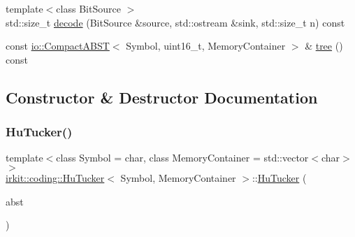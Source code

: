 \begin{DoxyCompactItemize}
\item 
{\footnotesize template$<$class Bit\+Source $>$ }\\std\+::size\+\_\+t \mbox{\hyperlink{classirkit_1_1coding_1_1HuTucker_a2c4e9a57c3eec1627d95e776330f67f7}{decode}} (Bit\+Source \&source, std\+::ostream \&sink, std\+::size\+\_\+t n) const
\item 
const \mbox{\hyperlink{classirkit_1_1io_1_1CompactABST}{io\+::\+Compact\+A\+B\+ST}}$<$ Symbol, uint16\+\_\+t, Memory\+Container $>$ \& \mbox{\hyperlink{classirkit_1_1coding_1_1HuTucker_a36caf73ad9a33cfe361ae8920c08a751}{tree}} () const
\end{DoxyCompactItemize}


\subsection{Constructor \& Destructor Documentation}
\mbox{\label{classirkit_1_1coding_1_1HuTucker_aa491f386d09d0e9c56f3f3558f2774a3}} 
\subsubsection{\texorpdfstring{Hu\+Tucker()}{HuTucker()}\hspace{0.1cm}{\footnotesize\ttfamily [1/2]}}
{\footnotesize\ttfamily template$<$class Symbol  = char, class Memory\+Container  = std\+::vector$<$char$>$$>$ \\
\mbox{\hyperlink{classirkit_1_1coding_1_1HuTucker}{irkit\+::coding\+::\+Hu\+Tucker}}$<$ Symbol, Memory\+Container $>$\+::\mbox{\hyperlink{classirkit_1_1coding_1_1HuTucker}{Hu\+Tucker}} (\begin{DoxyParamCaption}\item[{\mbox{\hyperlink{classirkit_1_1io_1_1CompactABST}{io\+::\+Compact\+A\+B\+ST}}$<$ Symbol, uint16\+\_\+t, Memory\+Container $>$}]{abst }\end{DoxyParamCaption})\hspace{0.3cm}{\ttfamily [inline]}}

\mbox{\label{classirkit_1_1coding_1_1HuTucker_ab4c34694c7ffc702a59468d18d355fec}} 
